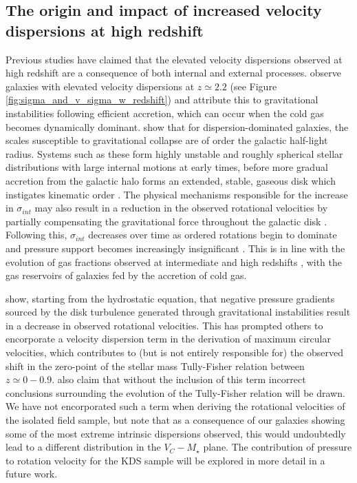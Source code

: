 \documentclass[fleqn,usenatbib]{mn2e}
\begin{document}
\subsection{The origin and impact of increased velocity dispersions at high redshift}\label{discussion_increase_in_sigma}
Previous studies have claimed that the elevated velocity dispersions observed at high redshift are a consequence of both internal and external processes.
\cite{Law2009} observe galaxies with elevated velocity dispersions at $z\simeq2.2$ (see Figure \ref{fig:sigma_and_v_sigma_w_redshift}) and attribute this to gravitational instabilities following efficient accretion, which can occur when the cold gas becomes dynamically dominant.
\cite{Genzel2011} show that for dispersion-dominated galaxies, the scales susceptible to gravitational collapse are of order the galactic half-light radius. 
Systems such as these form highly unstable and roughly spherical stellar distributions with large internal motions at early times, before more gradual accretion from the galactic halo forms an extended, stable, gaseous disk which instigates kinematic order \citep{Law2009,Genzel2011}.
The physical mechanisms responsible for the increase in $\sigma_{int}$ may also result in a reduction in the observed rotational velocities by partially compensating the gravitational force throughout the galactic disk \citep[e.g.][]{Burkert2010,Wuyts2016b,Ubler2017,Genzel2017,Lang2017}.
Following this, $\sigma_{int}$ decreases over time as ordered rotations begin to dominate and pressure support becomes increasingly insignificant \citep[e.g.][]{Burkert2010,Ubler2017,Genzel2017,Lang2017}.
This is in line with the evolution of gas fractions observed at intermediate and high redshifts \citep[e.g.][]{Saintonge2013,Tacconi2013,Tacconi2017}, with the gas reservoirs of galaxies fed by the accretion of cold gas.

\cite{Burkert2010} show, starting from the hydrostatic equation, that negative pressure gradients sourced by the disk turbulence generated through gravitational instabilities result in a decrease in observed rotational velocities. 
This has prompted others \citep[e.g.][]{Wuyts2016b,Ubler2017,Lang2017} to encorporate a velocity dispersion term in the derivation of maximum circular velocities, which contributes to (but is not entirely responsible for) the observed shift in the zero-point of the stellar mass Tully-Fisher relation between $z\simeq0-0.9$.
\cite{Ubler2017} also claim that without the inclusion of this term incorrect conclusions surrounding the evolution of the Tully-Fisher relation will be drawn.
We have not encorporated such a term when deriving the rotational velocities of the isolated field sample, but note that as a consequence of our galaxies showing some of the most extreme intrinsic dispersions observed, this would undoubtedly lead to a different distribution in the $V_{C}-M_{\star}$ plane.
The contribution of pressure to rotation velocity for the KDS sample will be explored in more detail in a future work. 
\\
\end{document}
